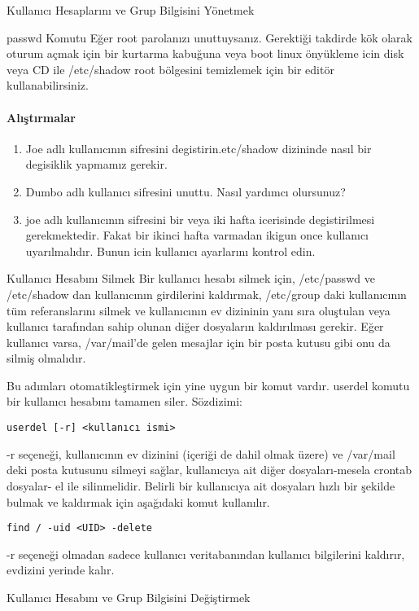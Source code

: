 \begin{section}{Kullanıcı Hesaplarını ve Grup Bilgisini Yönetmek}
\begin{subsection}{passwd Komutu}
Eğer root parolanızı unuttuysanız. Gerektiği takdirde kök olarak oturum açmak için bir kurtarma kabuğuna veya boot linux önyükleme icin disk veya CD ile /etc/shadow root bölgesini temizlemek için bir editör kullanabilirsiniz.
\paragraph{{\Huge{\PencilLeftDown}}Alıştırmalar}{
\begin{enumerate}
\item Joe adlı kullanıcının  sifresini degistirin.etc/shadow dizininde nasıl bir degisiklik yapmamız gerekir.
\item Dumbo adlı kullanıcı sifresini unuttu. Nasıl yardımcı olursunuz?
\item joe adlı kullanıcının sifresini bir veya iki hafta icerisinde degistirilmesi gerekmektedir. Fakat bir ikinci hafta varmadan ikigun once kullanıcı uyarılmalıdır. Bunun icin kullanıcı ayarlarını kontrol edin.
\end{enumerate}}
\end{subsection}
\begin{subsection}{Kullanıcı Hesabını Silmek}
Bir kullanıcı hesabı silmek için, /etc/passwd ve /etc/shadow dan kullanıcının girdilerini kaldırmak, /etc/group daki kullanıcının tüm referanslarını silmek ve kullanıcının ev dizininin yanı sıra oluştulan veya kullanıcı tarafından sahip olunan diğer dosyaların kaldırılması gerekir. Eğer kullanıcı varsa, /var/mail'de gelen mesajlar için bir posta kutusu gibi onu da silmiş olmalıdır.

Bu adımları otomatikleştirmek için yine uygun bir komut vardır. userdel komutu bir kullanıcı hesabını tamamen siler. Sözdizimi:
\begin{verbatim}
userdel [-r] <kullanıcı ismi>
\end{verbatim}

-r seçeneği, kullanıcının ev dizinini (içeriği de dahil olmak üzere) ve /var/mail deki posta kutusunu silmeyi sağlar, kullanıcıya ait diğer dosyaları-mesela crontab dosyalar- el ile silinmelidir. Belirli bir kullanıcıya ait dosyaları hızlı bir şekilde bulmak ve kaldırmak için aşağıdaki komut kullanılır.
\begin{verbatim}
find / -uid <UID> -delete
\end{verbatim}
-r seçeneği olmadan sadece kullanıcı veritabanından kullanıcı bilgilerini kaldırır, evdizini yerinde kalır.
\end{subsection}
\begin{subsection}{Kullanıcı Hesabını ve Grup Bilgisini Değiştirmek}


\end{subsection}
\end{section}
